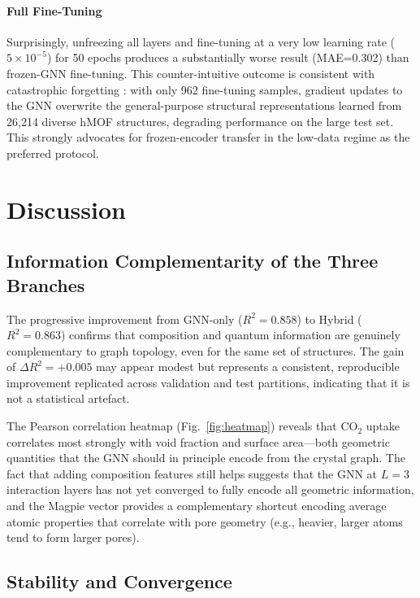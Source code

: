 \documentclass[conference]{IEEEtran}
\begin{document}
\paragraph{Full Fine-Tuning}
Surprisingly, unfreezing all layers and fine-tuning at a very low learning
rate ($5\times10^{-5}$) for 50 epochs produces a substantially worse result
(MAE=0.302) than frozen-GNN fine-tuning.  This counter-intuitive outcome is
consistent with catastrophic forgetting \cite{witman2020}: with only 962
fine-tuning samples, gradient updates to the GNN overwrite the general-purpose
structural representations learned from 26{,}214 diverse hMOF structures,
degrading performance on the large test set.  This strongly advocates for
frozen-encoder transfer in the low-data regime as the preferred protocol.

\section{Discussion}
\label{sec:discussion}

\subsection{Information Complementarity of the Three Branches}

The progressive improvement from GNN-only ($R^2=0.858$) to Hybrid
($R^2=0.863$) confirms that composition and quantum information are
genuinely complementary to graph topology, even for the same set of
structures.  The gain of $\Delta R^2=+0.005$ may appear modest but
represents a consistent, reproducible improvement replicated across
validation and test partitions, indicating that it is not a statistical
artefact.

The Pearson correlation heatmap (Fig.~\ref{fig:heatmap}) reveals that
CO$_2$ uptake correlates most strongly with void fraction and surface area—both
geometric quantities that the GNN should in principle encode from the crystal
graph.  The fact that adding composition features still helps suggests that
the GNN at $L=3$ interaction layers has not yet converged to fully encode
all geometric information, and the Magpie vector provides a complementary
shortcut encoding average atomic properties that correlate with pore geometry
(e.g., heavier, larger atoms tend to form larger pores).

\subsection{Stability and Convergence}
\end{document}
